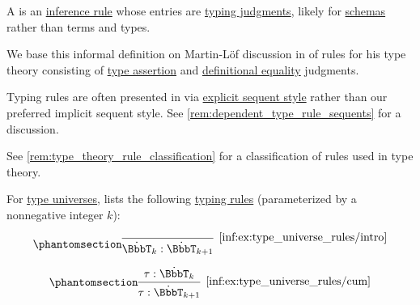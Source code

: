\begin{concept}\label{con:typing_rule}
  A  is an \hyperref[def:inference_rule]{inference rule} whose entries are \hyperref[rem:typing_judgments]{typing judgments}, likely for \hyperref[con:schemas_and_instances]{schemas} rather than terms and types.
\end{concept}
\begin{comments}
  \item We base this informal definition on Martin-L\"of discussion in \cite{MartinLöf1984IntuitionisticTypeTheory} of rules for his type theory consisting of \hyperref[def:type_assertion]{type assertion} and \hyperref[con:equality]{definitional equality} judgments.

  \item Typing rules are often presented in via \hyperref[rem:natural_deduction_explicit_sequents]{explicit sequent style} rather than our preferred implicit sequent style. See \cref{rem:dependent_type_rule_sequents} for a discussion.

  \item See \cref{rem:type_theory_rule_classification} for a classification of rules used in type theory.
\end{comments}

\begin{example}\label{ex:type_universe_rules}
  For \hyperref[con:type_universe]{type universes}, \cite[\S A.2.3]{UnivalentFoundationsProgram2013HoTT} lists the following \hyperref[con:typing_rule]{typing rules} (parameterized by a nonnegative integer \( k \)):
  \begin{paracol}{2}
    \begin{leftcolumn}
      \begin{equation*}\taglabel[\ensuremath{ \BbbT_+ }]{inf:ex:type_universe_rules/intro}
        \begin{prooftree}
          \infer0[\ref{inf:ex:type_universe_rules/intro}]{ \syn\BbbT_k: \syn\BbbT_{k+1} }
        \end{prooftree}
      \end{equation*}
    \end{leftcolumn}

    \begin{rightcolumn}
      \begin{equation*}\taglabel[\ensuremath{ \BbbT_{\logic{cum}} }]{inf:ex:type_universe_rules/cum}
        \begin{prooftree}
          \hypo{ \tau: \syn\BbbT_k }
          \infer1[\ref{inf:ex:type_universe_rules/cum}]{ \tau: \syn\BbbT_{k+1} }
        \end{prooftree}
      \end{equation*}
    \end{rightcolumn}
  \end{paracol}
\end{example}

